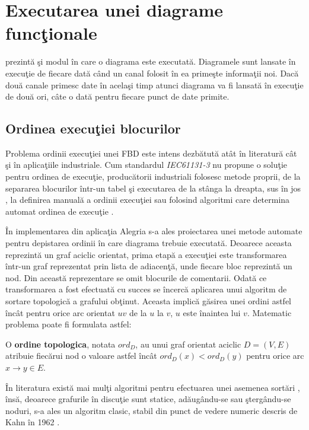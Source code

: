 \section{Executarea unei diagrame funcţionale}
 prezintă şi modul în care o diagrama este executată. Diagramele sunt lansate în execuţie de fiecare dată când un canal folosit în ea primeşte informaţii noi. Dacă două canale primesc date în acelaşi timp atunci diagrama va fi lansată în execuţie de două ori, câte o dată pentru fiecare punct de date primite.

\subsection{Ordinea execuţiei blocurilor}
Problema ordinii execuţiei unei FBD este intens dezbătută atât în literatură cât şi în aplicaţiile industriale. Cum standardul \textit{IEC61131-3} \autocite{IEC61131-3} nu propune o soluţie pentru ordinea de execuţie, producătorii industriali folosesc metode proprii, de la separarea blocurilor într-un tabel şi executarea de la stânga la dreapta, sus în jos \autocite[11]{TM241}, la definirea manuală a ordinii execuţiei \autocite[11]{Logix5000} sau folosind algoritmi care determina automat ordinea de execuţie \autocite[5]{GEFANUC}.

În implementarea din aplicaţia Alegria s-a ales proiectarea unei metode automate pentru depistarea ordinii în care diagrama trebuie executată. Deoarece aceasta reprezintă un graf aciclic orientat, prima etapă a execuţiei este transformarea într-un graf reprezentat prin lista de adiacenţă, unde fiecare bloc reprezintă un nod. Din această reprezentare se omit blocurile de comentarii. Odată ce transformarea a fost efectuată cu succes se încercă aplicarea unui algoritm de sortare topologică \autocite{toposort} a grafului obţinut. Aceasta implică găsirea unei ordini astfel încât pentru orice arc orientat $uv$ de la  $u$ la $v$, $u$ este înaintea lui $v$. 
Matematic problema poate fi formulata astfel:

\begin{definition} 
	O \textbf{ordine topologica}, notata $ord_D$, au unui graf orientat aciclic $D = (V,E)$ atribuie fiecărui nod o valoare astfel încât $ord_D(x) < ord_D(y)$ pentru orice arc $ x \rightarrow y \in E$.
\end{definition}
În literatura există mai mulţi algoritmi pentru efectuarea unei asemenea sortări \autocite{toposortArticle}, însă, deoarece grafurile în discuţie sunt statice, adăugându-se sau ştergându-se noduri, s-a ales un algoritm clasic, stabil din punct de vedere numeric descris de Kahn în 1962 \autocite{topoKahn}.

